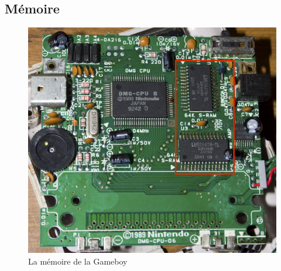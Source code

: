 \documentclass[a4paper]{article}
\begin{document}
\newpage


\subsection{Mémoire}

\begin{figure}[!h]
  \centering
  \includegraphics[scale=0.1]{images/mem.jpg}
  \caption{La mémoire de la Gameboy}
\end{figure}
\end{document}
